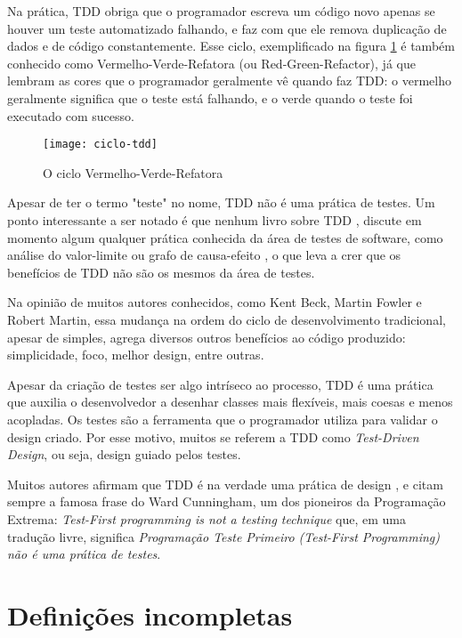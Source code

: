 Na prática, TDD obriga que o programador escreva um código novo apenas se houver
um teste automatizado falhando, e faz com que ele remova duplicação de dados e
de código constantemente. Esse ciclo, exemplificado na figura
\ref{fig:red-green-refactor} é também conhecido como Vermelho-Verde-Refatora
(ou Red-Green-Refactor), já que lembram as cores que o programador geralmente
vê quando faz TDD: o vermelho geralmente significa que o teste está falhando, e
o verde quando o teste foi executado com sucesso.

\begin{figure}
  \centering
  \texttt{[image: ciclo-tdd]}
  \caption{O ciclo Vermelho-Verde-Refatora}
  \label{fig:red-green-refactor}
\end{figure}

Apesar de ter o termo "teste" no nome, TDD não é uma prática de testes.
Um ponto interessante a ser notado é que nenhum livro sobre TDD \cite{GOOS}
\cite{TDDByExample} \cite{astels-tdd}, discute em momento algum qualquer
prática conhecida da área de testes de software, como análise do valor-limite ou
grafo de causa-efeito \cite{art-of-sw-testing}, o que leva a crer que os
benefícios de TDD não são os mesmos da área de testes.

Na opinião de muitos autores conhecidos, como Kent Beck, Martin Fowler e Robert
Martin, essa mudança na ordem do ciclo de desenvolvimento tradicional, apesar de
simples, agrega diversos outros benefícios ao código produzido: simplicidade,
foco, melhor design, entre outras.

Apesar da criação de testes ser algo intríseco ao processo, TDD é uma prática
que auxilia o desenvolvedor a desenhar classes mais flexíveis, mais coesas e
menos acopladas. Os testes são a ferramenta que o programador utiliza para
validar o design criado. Por esse motivo, muitos se referem a TDD como
\textit{Test-Driven Design}, ou seja, design guiado pelos testes.

Muitos autores afirmam que TDD é na verdade uma prática de design
\cite{tdd-taxonomy} \cite{aim-fire}, e citam sempre a famosa frase do Ward
Cunningham, um dos pioneiros da Programação Extrema: \textit{Test-First
programming is not a testing technique} que, em uma tradução livre, significa
\textit{Programação Teste Primeiro (Test-First Programming) não é uma prática
de testes}.

\section{Definições incompletas}

